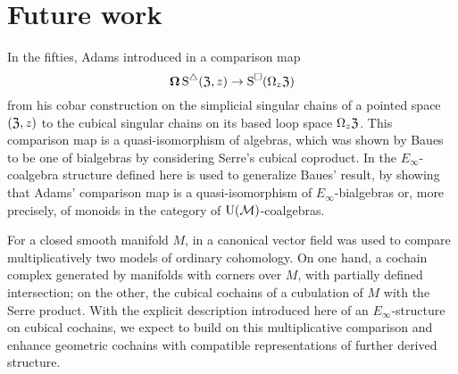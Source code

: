 \section{Future work} \label{s:future}

In the fifties, Adams introduced in \cite{adams1956cobar} a comparison map
\[
\operatorname{\mathbf{\Omega}} \operatorname{\operatorname{S}^{\triangle}}(\mathfrak{Z},z) \to \operatorname{\operatorname{S}^{\square}}(\Omega_z \mathfrak{Z})
\]
from his cobar construction on the simplicial singular chains of a pointed space $(\mathfrak{Z},z)$ to the cubical singular chains on its based loop space $\Omega_z \mathfrak{Z}$.
This comparison map is a quasi-isomorphism of algebras, which was shown by Baues \cite{baues1998hopf} to be one of bialgebras by considering Serre's cubical coproduct.
In \cite{medina2021cobar} the $E_\infty$-coalgebra structure defined here is used to generalize Baues' result, by showing that Adams' comparison map is a quasi-isomorphism of $E_\infty$-bialgebras or, more precisely, of monoids in the category of ${\operatorname{U}(\mathcal{M})}$-coalgebras.

For a closed smooth manifold $M$, in \cite{medina2021flowing} a canonical vector field was used to compare multiplicatively two models of ordinary cohomology.
On one hand, a cochain complex generated by manifolds with corners over $M$, with partially defined intersection; on the other, the cubical cochains of a cubulation of $M$ with the Serre product.
With the explicit description introduced here of an $E_\infty$-structure on cubical cochains, we expect to build on this multiplicative comparison and enhance geometric cochains \cite{medina2022foundations} with compatible representations of further derived structure.